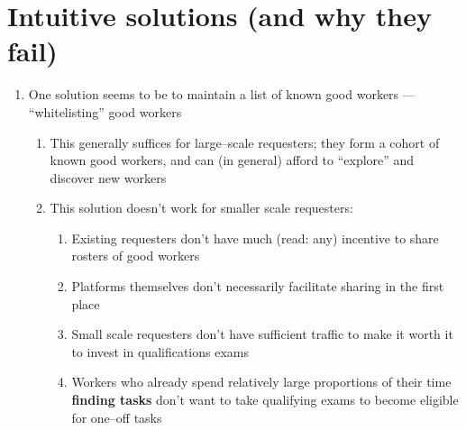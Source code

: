 \documentclass[10pt]{article}
\begin{document}
\section*{Intuitive solutions (and why they fail)}
\begin{enumerate}[noitemsep]
  \item One solution seems to be to maintain a list of known good workers --- ``whitelisting'' good workers
  \begin{enumerate}[noitemsep]
    \item This generally suffices for large--scale requesters; they form a cohort of known good workers, and
          can (in general) afford to ``explore'' and discover new workers
    \item This solution doesn't work for smaller scale requesters:
    \begin{enumerate}[noitemsep]
      \item Existing requesters don't have much (read: any) incentive to share rosters of good workers
      \item Platforms themselves don't necessarily facilitate sharing in the first place
      \item Small scale requesters don't have sufficient traffic to make it worth it to invest in qualifications exams
      \item Workers who already spend relatively large proportions of their time \textbf{finding tasks}
            don't want to take qualifying exams to become eligible for one--off tasks
    \end{enumerate}
  \end{enumerate}
\end{enumerate}
\end{document}
